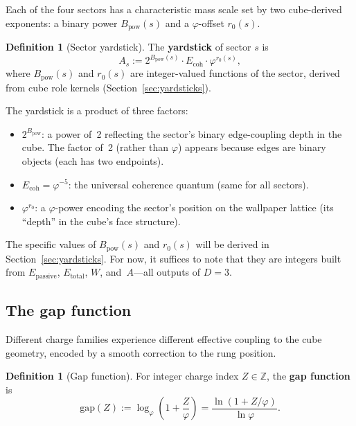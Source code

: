 \documentclass[11pt,a4paper]{article}
\theoremstyle{definition}
\newtheorem{definition}[theorem]{Definition}
\theoremstyle{remark}
\newcommand{\phig}{\varphi}
\newcommand{\Ecoh}{E_{\mathrm{coh}}}
\newcommand{\Epass}{E_{\mathrm{passive}}}
\newcommand{\Etot}{E_{\mathrm{total}}}
\newcommand{\Zidx}{Z}
\begin{document}
Each of the four sectors has a characteristic mass scale set by two
cube-derived exponents: a binary power $B_{\mathrm{pow}}(s)$ and a
$\phig$-offset $r_0(s)$.

\begin{definition}[Sector yardstick]
\label{def:yardstick}
The \textbf{yardstick} of sector $s$ is
\begin{equation}
  \boxed{A_s := 2^{B_{\mathrm{pow}}(s)} \cdot \Ecoh \cdot \phig^{r_0(s)},}
  \label{eq:yardstick}
\end{equation}
where $B_{\mathrm{pow}}(s)$ and $r_0(s)$ are integer-valued functions of the
sector, derived from cube role kernels (Section~\ref{sec:yardsticks}).
\end{definition}

\noindent
The yardstick is a product of three factors:
\begin{itemize}[nosep]
  \item $2^{B_{\mathrm{pow}}}$: a power of~2 reflecting the sector's binary
        edge-coupling depth in the cube.  The factor of~2 (rather than $\phig$)
        appears because edges are binary objects (each has two endpoints).
  \item $\Ecoh = \phig^{-5}$: the universal coherence quantum (same for all
        sectors).
  \item $\phig^{r_0}$: a $\phig$-power encoding the sector's position on the
        wallpaper lattice (its ``depth'' in the cube's face structure).
\end{itemize}

\noindent
The specific values of $B_{\mathrm{pow}}(s)$ and $r_0(s)$ will be derived in
Section~\ref{sec:yardsticks}.  For now, it suffices to note that they are
integers built from $\Epass$, $\Etot$, $W$, and~$A$---all outputs of
$D = 3$.

\subsection{The gap function}

Different charge families experience different effective coupling to the
cube geometry, encoded by a smooth correction to the rung position.

\begin{definition}[Gap function]
\label{def:gap}
For integer charge index $\Zidx \in \mathbb{Z}$, the \textbf{gap function} is
\begin{equation}
  \boxed{\mathrm{gap}(\Zidx) := \log_{\phig}\!\left(1 + \frac{\Zidx}{\phig}\right)
  = \frac{\ln\!\left(1 + \Zidx/\phig\right)}{\ln \phig}.}
  \label{eq:gap}
\end{equation}
\end{definition}
\end{document}
